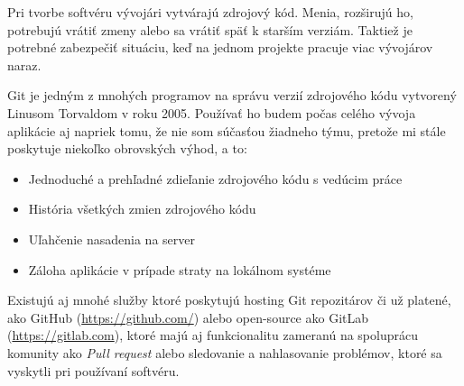 Pri tvorbe softvéru vývojári vytvárajú zdrojový kód. Menia, rozširujú ho, potrebujú vrátiť zmeny alebo sa vrátiť späť k starším verziám. Taktiež je potrebné zabezpečiť situáciu, keď na jednom projekte pracuje viac vývojárov naraz. \citep{otte2009version} 

Git je jedným z mnohých programov na správu verzií zdrojového kódu vytvorený Linusom Torvaldom v roku 2005. Používať ho budem počas celého vývoja aplikácie aj napriek tomu, že nie som súčasťou žiadneho týmu, pretože mi stále poskytuje niekoľko obrovských výhod, a to: 

\begin{itemize}
    \item Jednoduché a prehľadné zdieľanie zdrojového kódu s vedúcim práce
    \item História všetkých zmien zdrojového kódu
    \item Uľahčenie nasadenia na server
    \item Záloha aplikácie v prípade straty na lokálnom systéme
\end{itemize}

Existujú aj mnohé služby ktoré poskytujú hosting Git repozitárov či už platené, ako GitHub (\url{https://github.com/}) alebo open-source ako GitLab (\url{https://gitlab.com}), ktoré majú aj funkcionalitu zameranú na spoluprácu komunity ako \emph{Pull request} alebo sledovanie a nahlasovanie problémov, ktoré sa vyskytli pri používaní softvéru.
